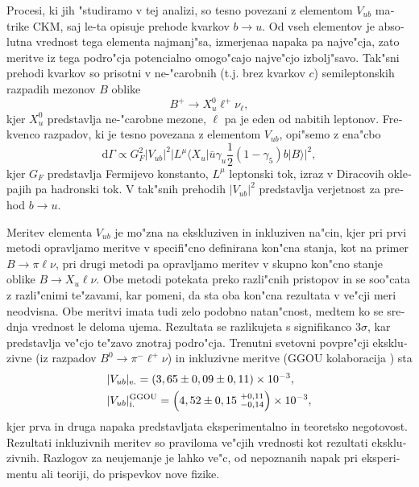 \begin{otherlanguage}{slovene}
Procesi, ki jih "studiramo v tej analizi, so tesno povezani z elementom $V_{ub}$ matrike CKM, saj le-ta opisuje prehode kvarkov $b \to u$. Od vseh elementov je absolutna vrednost tega elementa najmanj"sa, izmerjenaa napaka pa najve"cja, zato meritve iz tega podro"cja potencialno omogo"cajo najve"cjo izbolj"savo. Tak"sni prehodi kvarkov so prisotni v ne-"carobnih (t.j. brez kvarkov $c$) semileptonskih razpadih mezonov $B$ oblike 
\begin{equation}
B^+ \to X_u^0 \ell^+ \nu_\ell,
\end{equation}
kjer $X_u^0$ predstavlja ne-"carobne mezone, $\ell$ pa je eden od nabitih leptonov. Frekvenco razpadov, ki je tesno povezana z elementom $V_{ub}$, opi"semo z ena"cbo
\begin{equation}
\mathrm{d} \Gamma \propto G_F^2 \vert V_{ub} \vert ^2 \vert L^\mu \langle X_u \vert \bar u \gamma_u \frac{1}{2} (1-\gamma_5) b \vert B \rangle \vert ^2,
\end{equation}
kjer $G_F$ predstavlja Fermijevo konstanto, $L^\mu$ leptonski tok, izraz v Diracovih oklepajih pa hadronski tok. V tak"snih prehodih $\vert V_{ub} \vert ^2$ predstavlja verjetnost za prehod $b \to u$.

Meritev elementa $V_{ub}$ je mo"zna na ekskluziven in inkluziven na"cin, kjer pri prvi metodi opravljamo meritve v specifi"cno definirana kon"cna stanja, kot na primer $B \to \pi \ell \nu$, pri drugi metodi pa opravljamo meritev v skupno kon"cno stanje oblike $B \to X_u \ell \nu$. Obe metodi potekata preko razli"cnih pristopov in se soo"cata z razli"cnimi te"zavami, kar pomeni, da sta oba kon"cna rezultata v ve"cji meri neodvisna. Obe meritvi imata tudi zelo podobno natan"cnost, medtem ko se srednja vrednost le deloma ujema. Rezultata se razlikujeta s signifikanco $3\sigma$, kar predstavlja ve"cjo te"zavo znotraj podro"cja. Trenutni svetovni povpre"cji \cite{Amhis:2016xyh} ekskluzivne (iz razpadov $B^0 \to \pi^- \ell^+ \nu$) in inkluzivne meritve (GGOU kolaboracija \cite{Gambino:2007rp}) sta
\begin{align}
&\vert V_{ub} \vert_{\mathrm{e.}} = \left(3,65 \pm 0,09 \pm 0,11\right)\times 10^{-3},\\
&\vert V_{ub} \vert_{\mathrm{i.}}^{\mathrm{GGOU}} = \left(4,52 \pm 0,15~{}^{+0,11}_{-0,14}\right)\times 10^{-3},
\end{align}
kjer prva in druga napaka predstavljata eksperimentalno in teoretsko negotovost. Rezultati inkluzivnih meritev so praviloma ve"cjih vrednosti kot rezultati ekskluzivnih. Razlogov za neujemanje je lahko ve"c, od nepoznanih napak pri eksperimentu ali teoriji, do prispevkov nove fizike.


\end{otherlanguage}
